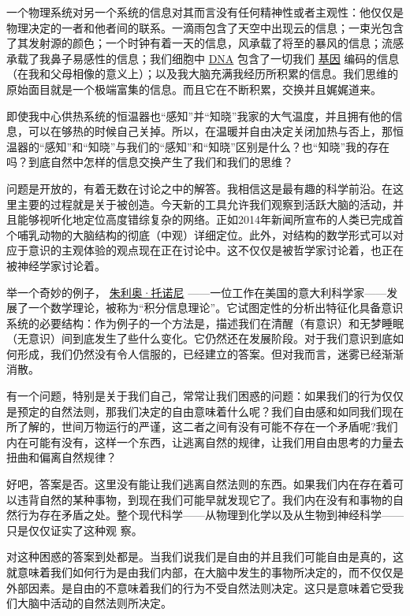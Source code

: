     一个物理系统对另一个系统的信息对其而言没有任何精神性或者主观性：他仅仅是物理决定的一者和他者间的联系。一滴雨包含了天空中出现云的信息；一束光包含了其发射源的颜色；一个时钟有着一天的信息，风承载了将至的暴风的信息；流感承载了我鼻子易感性的信息；我们细胞中
\href{http://toyhouse.cc/wiki/index.php/DNA}{DNA}
包含了一切我们
\href{http://toyhouse.cc/wiki/index.php/基因}{基因}
编码的信息（在我和父母相像的意义上）；以及我大脑充满我经历所积累的信息。我们思维的原始面目就是一个极端富集的信息。而且它在不断积累，交换并且娓娓道来。
 
   即使我中心供热系统的恒温器也“感知”并“知晓”我家的大气温度，并且拥有他的信息，可以在够热的时候自己关掉。所以，在温暖并自由决定关闭加热与否上，那恒温器的“感知”和“知晓”与我们的“感知”和“知晓”区别是什么？也“知晓”我的存在吗？到底自然中怎样的信息交换产生了我们和我们的思维？

    问题是开放的，有着无数在讨论之中的解答。我相信这是最有趣的科学前沿。在这里主要的过程就是关于被创造。今天新的工具允许我们观察到活跃大脑的活动，并且能够视听化地定位高度错综复杂的网络。正如2014年新闻所宣布的人类已完成首个哺乳动物的大脑结构的彻底（中观）详细定位。此外，对结构的数学形式可以对应于意识的主观体验的观点现在正在讨论中。这不仅仅是被哲学家讨论着，也正在被神经学家讨论着。

    举一个奇妙的例子，
\href{https://en.wikipedia.org/wiki/Giulio Tononi}{朱利奥·托诺尼}
——一位工作在美国的意大利科学家——发展了一个数学理论，被称为“积分信息理论”。它试图定性的分析出特征化具备意识系统的必要结构：作为例子的一个方法是，描述我们在清醒（有意识）和无梦睡眠（无意识）间到底发生了些什么变化。它仍然还在发展阶段。对于我们意识到底如何形成，我们仍然没有令人信服的，已经建立的答案。但对我而言，迷雾已经渐渐消散。

    有一个问题，特别是关于我们自己，常常让我们困惑的问题：如果我们的行为仅仅是预定的自然法则，那我们决定的自由意味着什么呢？我们自由感和如同我们现在所了解的，世间万物运行的严谨，这二者之间有没有可能不存在一个矛盾呢?我们内在可能有没有，这样一个东西，让逃离自然的规律，让我们用自由思考的力量去扭曲和偏离自然规律？

    好吧，答案是否。这里没有能让我们逃离自然法则的东西。如果我们内在存在着可以违背自然的某种事物，到现在我们可能早就发现它了。我们内在没有和事物的自然行为存在矛盾之处。整个现代科学——从物理到化学以及从生物到神经科学——只是仅仅证实了这种观
察。
 
   对这种困惑的答案到处都是。当我们说我们是自由的并且我们可能自由是真的，这就意味着我们如何行为是由我们内部，在大脑中发生的事物所决定的，而不仅仅是外部因素。是自由的不意味着我们的行为不受自然法则决定。这只是意味着它受我们大脑中活动的自然法则所决定。

